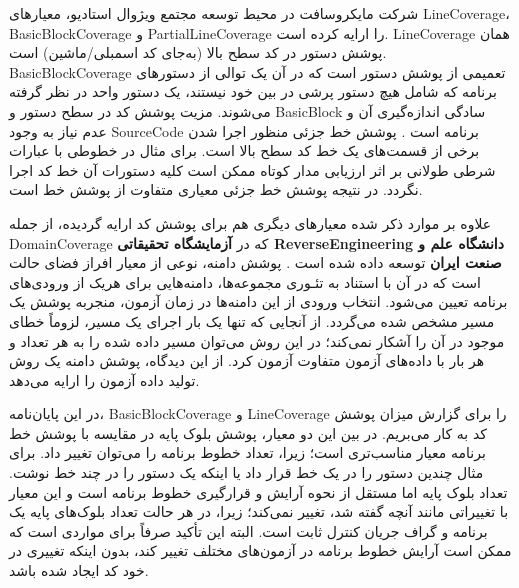   شرکت مایکروسافت در محیط توسعه مجتمع ویژوال استادیو، معیارهای  \gls{LineCoverage}، \gls{BasicBlockCoverage} و \gls{PartialLineCoverage} را ارایه کرده است. \gls{LineCoverage} همان پوشش دستور در کد سطح بالا (به‌جای کد اسمبلی/ماشین) است. \gls{BasicBlockCoverage} تعمیمی از پوشش دستور است که در آن یک توالی از دستورهای برنامه که شامل هیچ دستور پرشی در بین خود نیستند، یک دستور واحد در نظر گرفته ‌می‌شوند. مزیت پوشش کد در سطح دستور و \gls{BasicBlock} سادگی اندازه‌گیری آن و عدم نیاز به وجود \gls{SourceCode} برنامه است \cite{Dubrova:2013:FD:2462571}. پوشش خط جزئی منظور اجرا شدن برخی از قسمت‌های یک خط کد سطح بالا است. برای مثال در خطوطی با عبارات شرطی طولانی بر اثر ارزیابی مدار کوتاه  
   ممکن است کلیه دستورات آن خط کد اجرا نگردد. در نتیجه پوشش خط جزئی معیاری متفاوت از پوشش خط است.
  
  
  علاوه بر موارد ذکر شده معیارهای دیگری هم برای پوشش کد ارایه گردیده، از جمله \gls{DomainCoverage} که در \textbf{آزمایشگاه تحقیقاتی \gls{ReverseEngineering} دانشگاه علم و صنعت ایران}
توسعه داده شده است \cite{Nikravan2018}. پوشش دامنه، نوعی از معیار افراز فضای حالت 
\cite{ammann2016introduction}
است که در آن با استناد به تئـوری مجموعه‌ها، دامنه‌هایی برای هریک از ورودی‌های برنامه تعیین می‌شود. انتخاب ورودی از این دامنه‌ها در زمان آزمون، منجربه پوشش یک مسیر مشخص شده می‌گردد. از آنجایی که تنها یک بار اجرای یک مسیر، لزوماً خطای موجود در آن را آشکار نمی‌کند؛ در این روش می‌توان مسیر داده‌ شده را به هر تعداد و هر بار با داده‌های آزمون متفاوت  آزمون کرد. از این دیدگاه، پوشش دامنه یک روش تولید داده آزمون را ارایه می‌دهد.

در این پایان‌نامه، \gls{BasicBlockCoverage} و \gls{LineCoverage}  را برای گزارش میزان پوشش کد به کار می‌بریم. در بین این دو معیار، پوشش بلوک پایه در مقایسه با پوشش خط برنامه معیار مناسب‌تری است؛ زیرا، تعداد خطوط برنامه را می‌توان تغییر داد. برای مثال چندین دستور را در یک خط قرار داد یا اینکه یک دستور را در چند خط نوشت. تعداد بلوک پایه اما مستقل از نحوه آرایش و قرارگیری خطوط برنامه است و این معیار با تغییراتی مانند آنچه گفته شد، تغییر نمی‌کند؛ زیرا، در هر حالت تعداد بلوک‌های پایه یک برنامه و گراف جریان کنترل ثابت است. البته این تأکید صرفاً برای مواردی است که ممکن است آرایش خطوط برنامه در آزمون‌های مختلف تغییر کند، بدون اینکه تغییری در خود کد ایجاد شده باشد.
  
